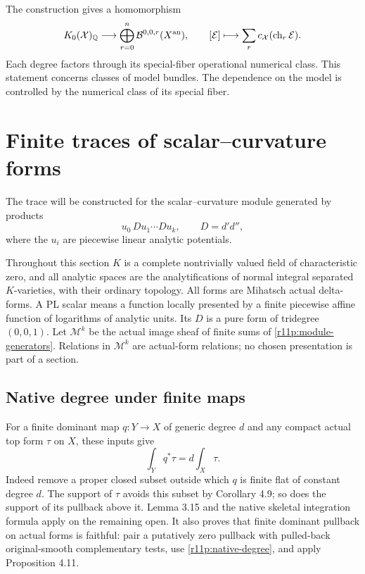 \documentclass[11pt]{article}
\theoremstyle{definition}
\theoremstyle{remark}
\numberwithin{equation}{section}
\begin{document}
The construction gives a homomorphism
\[
 K_0(\mathcal X)_{\mathbb Q}\longrightarrow
      \bigoplus_{r=0}^{n}\mathcal B^{0,0,r}(X^{\rm an}),
                  \qquad [\mathcal E]\longmapsto
                       \sum_r c_{\mathcal X}(\operatorname{ch}_r\mathcal E).
\]
Each degree factors through its special-fiber operational numerical
class.  This statement concerns classes of model bundles.  The dependence on the model is controlled by the numerical class of its special fiber.



\section{Finite traces of scalar--curvature forms}
\label{r11p:minimal-trace}

The trace will be constructed for the scalar--curvature module generated by products
\[
  u_0\,Du_1\cdots Du_k,\qquad D=d'd'',
\tag{MT1}\label{r11p:module-generators}
\]
where the $u_i$ are piecewise linear analytic potentials.

Throughout this section $K$ is a complete nontrivially valued field of
characteristic zero, and all analytic spaces are the analytifications of
normal integral separated $K$-varieties, with their ordinary topology.
All forms are Mihatsch actual delta-forms.  A PL scalar means a function
locally presented by a finite piecewise affine function of logarithms of
analytic units.  Its $D$ is a pure form of tridegree $(0,0,1)$.
Let $\mathscr M^k$ be the actual image sheaf of finite sums of
\eqref{r11p:module-generators}.  Relations in $\mathscr M^k$ are actual-form
relations; no chosen presentation is part of a section.

\subsection{Native degree under finite maps}

For a finite dominant map $q:Y\to X$ of generic degree $d$ and any compact
actual top form $\tau$ on $X$, these inputs give
\[
                            \int_Yq^*\tau=d\int_X\tau.
\tag{MT2}\label{r11p:native-degree}
\]
Indeed remove a proper closed subset outside which $q$ is finite flat of
constant degree $d$.  The support of $\tau$ avoids this subset by
Corollary 4.9; so does the support of its pullback above it.
Lemma 3.15 and the native skeletal integration formula apply on the
remaining open.    It also proves that finite dominant pullback on
actual forms is faithful: pair a putatively zero pullback with pulled-back
original-smooth complementary tests, use \eqref{r11p:native-degree}, and
apply Proposition 4.11.
\end{document}
